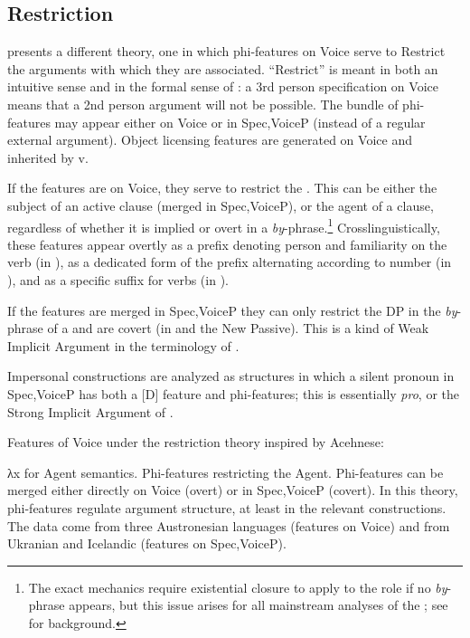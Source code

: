 \begin{exe}
\begin{xlist}
\begin{xlist}
\begin{xlist}
\begin{xlist}
\begin{xlist}
\begin{xlist}
\begin{exe}
\begin{xlist}
\begin{exe}
\begin{exe}
\begin{xlist}
\begin{exe}
\begin{exe}
\begin{xlist}
\begin{exe}
\begin{xlist}
\begin{exe}
\begin{xlist}
\begin{exe}
\begin{xlist}
\begin{exe}
\begin{xlist}
\begin{exe}
\begin{xlist}
	\subsection{Restriction}
\cite{legate12lang,legate14} presents a different theory, one in which phi-features on Voice serve to Restrict the arguments with which they are associated. ``Restrict'' is meant in both an intuitive sense and in the formal sense of \cite{chungladusaw04}: a 3rd person specification on Voice means that a 2nd person argument will not be possible. The bundle of phi-features may appear either on Voice or in Spec,VoiceP (instead of a regular external argument). Object licensing features are generated on Voice and inherited by v.

If the features are on Voice, they serve to restrict the . This can be either the subject of an active clause (merged in Spec,VoiceP), or the agent of a  clause, regardless of whether it is implied or overt in a \emph{by}-phrase.\footnote{The exact mechanics require existential closure to apply to the  role if no \emph{by}-phrase appears, but this issue arises for all mainstream analyses of the ; see \cite{williams15} for background.} Crosslinguistically, these features appear overtly as a prefix denoting person and familiarity on the verb (in ), as a dedicated form of the  prefix alternating according to number (in ), and as a specific suffix for   verbs (in ).

If the features are merged in Spec,VoiceP they can only restrict the DP in the \emph{by}-phrase of a  and are covert (in  and the  New Passive). This is a kind of Weak Implicit Argument in the terminology of \cite{landau10}.

Impersonal constructions are analyzed as structures in which a silent pronoun in Spec,VoiceP has both a [D] feature and phi-features; this is essentially \textit{pro}, or the Strong Implicit Argument of \cite{landau10}.
 \begin{exe}
 \ex  Features of Voice under the restriction theory inspired by Acehnese: 
 \begin{xlist} 
 	\ex  λx for Agent semantics. 
 	\ex  Phi-features restricting the Agent. 
 	\ex  Phi-features can be merged either directly on Voice (overt) or in Spec,VoiceP (covert). 
 \z
\z 
In this theory, phi-features regulate argument structure, at least in the relevant constructions. The data come from three Austronesian languages (features on Voice) and from Ukranian and Icelandic (features on Spec,VoiceP).


\end{xlist}
\end{exe}
\end{xlist}
\end{exe}
\end{xlist}
\end{exe}
\end{xlist}
\end{exe}
\end{xlist}
\end{exe}
\end{xlist}
\end{exe}
\end{xlist}
\end{exe}
\end{exe}
\end{xlist}
\end{exe}
\end{exe}
\end{xlist}
\end{exe}
\end{xlist}
\end{xlist}
\end{xlist}
\end{xlist}
\end{xlist}
\end{xlist}
\end{exe}
